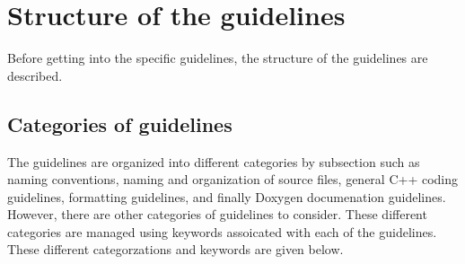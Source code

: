 %
\section{Structure of the guidelines}
%

Before getting into the specific guidelines, the structure of the
guidelines are described.


%
\subsection{Categories of guidelines}
%

The guidelines are organized into different categories by subsection
such as naming conventions, naming and organization of source files,
general C++ coding guidelines, formatting guidelines, and finally
Doxygen documenation guidelines.  However, there are other categories
of guidelines to consider.  These different categories are managed
using keywords assoicated with each of the guidelines.  These
different categorzations and keywords are given below.

